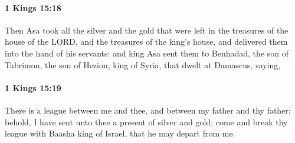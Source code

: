 		\paragraph{1 Kings 15:18} %
			\label{1KINGS-15-18}

			Then Asa took all the silver and the gold that were left in the treasures of the house of the LORD, and the treasures of the king’s house, and delivered them into the hand of his servants: and king Asa sent them to Benhadad, the son of Tabrimon, the son of Hezion, king of Syria, that dwelt at Damascus, saying,


		\paragraph{1 Kings 15:19} %
			\label{1KINGS-15-19}

			There is a league between me and thee, and between my father and thy father: behold, I have sent unto thee a present of silver and gold; come and break thy league with Baasha king of Israel, that he may depart from me.

